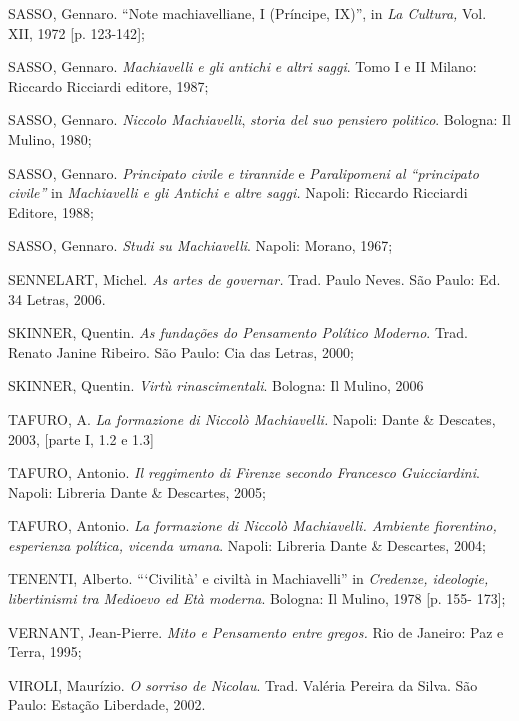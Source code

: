 \begin{Parskip}
SASSO, Gennaro. ``Note machiavelliane, I (Príncipe, IX)'', in \emph{La
Cultura,} Vol. XII, 1972 {[}p. 123-142{]};

SASSO, Gennaro. \emph{Machiavelli e gli antichi} \emph{e altri saggi}.
Tomo I e II Milano: Riccardo Ricciardi editore, 1987;

SASSO, Gennaro. \emph{Niccolo Machiavelli}, \emph{storia del suo
pensiero politico}. Bologna: Il Mulino, 1980;

SASSO, Gennaro. \emph{Principato civile e tirannide} e
\emph{Paralipomeni al ``principato civile''} in \emph{Machiavelli e gli
Antichi e altre saggi.} Napoli: Riccardo Ricciardi Editore, 1988;

SASSO, Gennaro. \emph{Studi su Machiavelli}. Napoli: Morano, 1967;

SENNELART, Michel. \emph{As artes de governar.} Trad. Paulo Neves. São
Paulo: Ed. 34 Letras, 2006.

SKINNER, Quentin. \emph{As fundações do Pensamento Político Moderno}.
Trad. Renato Janine Ribeiro. São Paulo: Cia das Letras, 2000;

SKINNER, Quentin. \emph{Virtù rinascimentali}. Bologna: Il Mulino, 2006

TAFURO, A. \emph{La formazione di Niccolò Machiavelli.} Napoli: Dante \&
Descates, 2003, {[}parte I, 1.2 e 1.3{]}

TAFURO, Antonio. \emph{Il reggimento di Firenze secondo Francesco
Guicciardini}. Napoli: Libreria Dante \& Descartes, 2005;

TAFURO, Antonio. \emph{La formazione di Niccolò Machiavelli. Ambiente
fiorentino, esperienza política, vicenda umana}. Napoli: Libreria Dante
\& Descartes, 2004;

TENENTI, Alberto. ```Civilità' e civiltà in Machiavelli'' in
\emph{Credenze, ideologie, libertinismi tra Medioevo ed Età moderna}.
Bologna: Il Mulino, 1978 {[}p. 155- 173{]};

VERNANT, Jean-Pierre. \emph{Mito e Pensamento entre gregos.} Rio de
Janeiro: Paz e Terra, 1995;

VIROLI, Maurízio. \emph{O sorriso de Nicolau}. Trad. Valéria Pereira da
Silva. São Paulo: Estação Liberdade, 2002.
\end{Parskip}